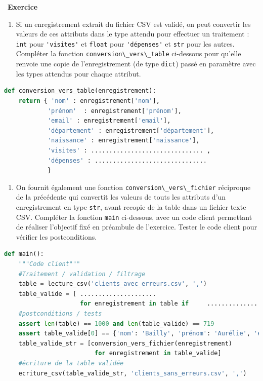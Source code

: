 \documentclass[
  11pt,
]{article}
\newcommand{\passthrough}[1]{#1}
\providecommand{\tightlist}{%
  \setlength{\itemsep}{0pt}\setlength{\parskip}{0pt}}
\newcounter{exo}
\newenvironment{exercice}[1]
{\par \medskip   \addtocounter{exo}{1} \noindent  
\begin{bclogo}[arrondi =0.1,   noborder = true, logo=\bccrayon, marge=4]{~\textbf{Exercice} \textbf{\theexo} {\itshape #1} }  \par}
{
\end{bclogo}
 \par \bigskip }
\newcounter{def}
\begin{document}
\begin{exercice}{}
\begin{enumerate}
\def\labelenumi{\arabic{enumi}.}
\setcounter{enumi}{3}
\tightlist
\item
  Si un enregistrement extrait du fichier CSV est validé, on peut
  convertir les valeurs de ces attributs dans le type attendu pour
  effectuer un traitement : \passthrough{\lstinline!int!} pour
  \passthrough{\lstinline!'visites'!} et \passthrough{\lstinline!float!}
  pour \passthrough{\lstinline!'dépenses'!} et
  \passthrough{\lstinline!str!} pour les autres. Compléter la fonction
  \passthrough{\lstinline!conversion\_vers\_table!} ci-dessous pour
  qu'elle renvoie une copie de l'enregistrement (de type
  \passthrough{\lstinline!dict!}) passé en paramètre avec les types
  attendus pour chaque attribut.
\end{enumerate}

\begin{lstlisting}[language=Python]
def conversion_vers_table(enregistrement):
    return { 'nom' : enregistrement['nom'],
            'prénom'  : enregistrement['prénom'],
            'email' : enregistrement['email'],
            'département' : enregistrement['département'],
            'naissance' : enregistrement['naissance'],
            'visites' : ............................... ,
            'dépenses' : ...............................
            }
\end{lstlisting}

\begin{enumerate}
\def\labelenumi{\arabic{enumi}.}
\setcounter{enumi}{4}
\tightlist
\item
  On fournit également une fonction
  \passthrough{\lstinline!conversion\_vers\_fichier!} réciproque de la
  précédente qui convertit les valeurs de touts les attributs d'un
  enregistrement en type \passthrough{\lstinline!str!}, avant recopie de
  la table dans un fichier texte CSV. Compléter la fonction
  \passthrough{\lstinline!main!} ci-dessous, avec un code client
  permettant de réaliser l'objectif fixé en préambule de l'exercice.
  Tester le code client pour vérifier les postconditions.
\end{enumerate}

\begin{lstlisting}[language=Python]
def main():
    """Code client"""
    #Traitement / validation / filtrage
    table = lecture_csv('clients_avec_erreurs.csv', ',')
    table_valide = [ .....................
                     for enregistrement in table if     .................        ]
    #postconditions / tests
    assert len(table) == 1000 and len(table_valide) == 719
    assert table_valide[0] == {'nom': 'Bailly', 'prénom': 'Aurélie', 'email': 'abailly1@gmail.com', 'département': '22', 'naissance': '1986-09-22', 'visites': 79, 'dépenses': 4389.47}
    table_valide_str = [conversion_vers_fichier(enregistrement)
                         for enregistrement in table_valide]
    #écriture de la table validée
    ecriture_csv(table_valide_str, 'clients_sans_erreurs.csv', ',')
\end{lstlisting}

\end{exercice}
\end{document}
